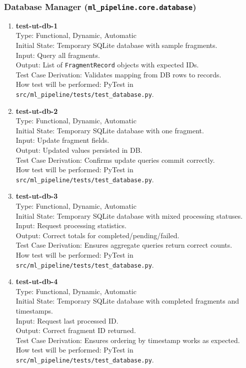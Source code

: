 \documentclass[12pt, titlepage]{article}
\begin{document}
\subsubsection{Database Manager (\texttt{ml\_pipeline.core.database})}

\begin{enumerate}
\item \textbf{test-ut-db-1}\\
Type: Functional, Dynamic, Automatic\\
Initial State: Temporary SQLite database with sample fragments.\\
Input: Query all fragments.\\
Output: List of \texttt{FragmentRecord} objects with expected IDs.\\
Test Case Derivation: Validates mapping from DB rows to records.\\
How test will be performed: PyTest in \texttt{src/ml\_pipeline/tests/test\_database.py}.\\

\item \textbf{test-ut-db-2}\\
Type: Functional, Dynamic, Automatic\\
Initial State: Temporary SQLite database with one fragment.\\
Input: Update fragment fields.\\
Output: Updated values persisted in DB.\\
Test Case Derivation: Confirms update queries commit correctly.\\
How test will be performed: PyTest in \texttt{src/ml\_pipeline/tests/test\_database.py}.\\

\item \textbf{test-ut-db-3}\\
Type: Functional, Dynamic, Automatic\\
Initial State: Temporary SQLite database with mixed processing statuses.\\
Input: Request processing statistics.\\
Output: Correct totals for completed/pending/failed.\\
Test Case Derivation: Ensures aggregate queries return correct counts.\\
How test will be performed: PyTest in \texttt{src/ml\_pipeline/tests/test\_database.py}.\\

\item \textbf{test-ut-db-4}\\
Type: Functional, Dynamic, Automatic\\
Initial State: Temporary SQLite database with completed fragments and timestamps.\\
Input: Request last processed ID.\\
Output: Correct fragment ID returned.\\
Test Case Derivation: Ensures ordering by timestamp works as expected.\\
How test will be performed: PyTest in \texttt{src/ml\_pipeline/tests/test\_database.py}.\\
\end{enumerate}
\end{document}
